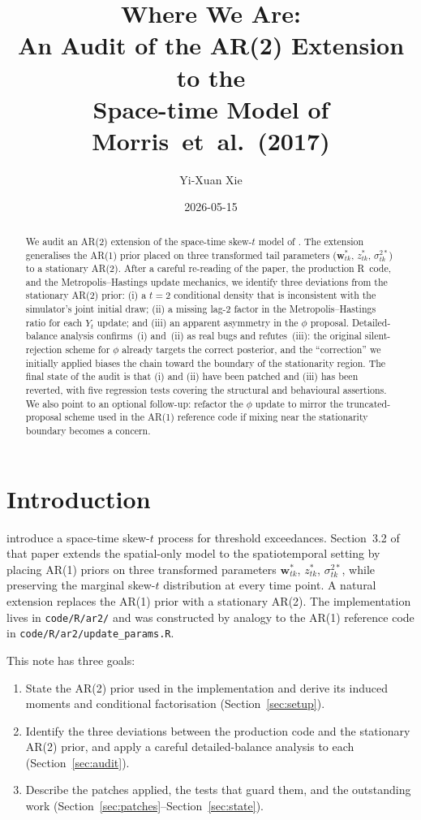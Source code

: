 \documentclass[11pt]{article}
\title{Where We Are:\\
       An Audit of the AR(2) Extension to the\\
       Space-time \Skewt Model of Morris~et~al.\ (2017)}
\author{Yi-Xuan Xie}
\date{2026-05-15}
\newcommand{\bw}{\mathbf{w}}
\newcommand{\skewt}{skew-$t$\xspace}
\newcommand{\sref}[1]{Section~\ref{#1}}
\theoremstyle{plain}
\theoremstyle{definition}
\theoremstyle{remark}
\begin{document}
\maketitle

\begin{abstract}
We audit an AR(2) extension of the space-time \skewt model of
\citet*{morris_space-time_2017}. The extension generalises the AR(1) prior placed on
three transformed tail parameters ($\bw^{*}_{tk}$, $z^{*}_{tk}$,
$\sigma^{2*}_{tk}$) to a stationary AR(2). After a careful re-reading of the
paper, the production R~code, and the Metropolis--Hastings update mechanics,
we identify three deviations from the stationary AR(2) prior: (i) a
$t = 2$ conditional density that is inconsistent with the simulator's joint
initial draw; (ii) a missing lag-2 factor in the Metropolis--Hastings ratio
for each $Y_t$ update; and (iii) an apparent asymmetry in the $\phi$ proposal.
Detailed-balance analysis confirms~(i) and~(ii) as real bugs and refutes~(iii):
the original silent-rejection scheme for $\phi$ already targets the correct
posterior, and the ``correction'' we initially applied biases the chain toward
the boundary of the stationarity region. The final state of the audit is
that (i) and (ii) have been patched and (iii) has been reverted, with five
regression tests covering the structural and behavioural assertions. We
also point to an optional follow-up: refactor the $\phi$ update to mirror
the truncated-proposal scheme used in the AR(1) reference code if mixing
near the stationarity boundary becomes a concern.
\end{abstract}

\section{Introduction}\label{sec:intro}

\citet*{morris_space-time_2017} introduce a space-time \skewt process for threshold
exceedances. Section~3.2 of that paper extends the spatial-only model to
the spatiotemporal setting by placing AR(1) priors on three transformed
parameters $\bw^{*}_{tk}$, $z^{*}_{tk}$, $\sigma^{2*}_{tk}$, while preserving
the marginal \skewt distribution at every time point. A natural extension
replaces the AR(1) prior with a stationary AR(2). The implementation lives
in \texttt{code/R/ar2/} and was constructed by analogy to the AR(1) reference
code in \texttt{code/R/ar2/update\_params.R}.

This note has three goals:
\begin{enumerate}
  \item State the AR(2) prior used in the implementation and derive its
        induced moments and conditional factorisation
        (\sref{sec:setup}).
  \item Identify the three deviations between the production code and the
        stationary AR(2) prior, and apply a careful detailed-balance
        analysis to each (\sref{sec:audit}).
  \item Describe the patches applied, the tests that guard them, and the
        outstanding work (\sref{sec:patches}--\sref{sec:state}).
\end{enumerate}
\end{document}
